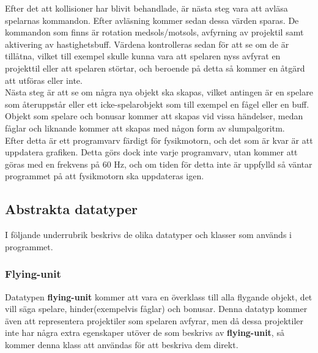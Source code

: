 \documentclass[12pt,a4paper]{article}
\begin{document}
Efter det att kollisioner har blivit behandlade, är nästa steg vara att avläsa spelarnas kommandon. Efter avläsning kommer sedan dessa värden sparas. De kommandon som finns är rotation medsols/motsols, avfyrning av projektil samt aktivering av hastighetsbuff. Värdena kontrolleras sedan för att se om de är tillåtna, vilket till exempel skulle kunna vara att spelaren nyss avfyrat en projekttil eller att spelaren störtar, och beroende på detta så kommer en åtgärd att utföras eller inte. \\

Nästa steg är att se om några nya objekt ska skapas, vilket antingen är en spelare som återuppstår eller ett icke-spelarobjekt som till exempel en fågel eller en buff. Objekt som spelare och bonusar kommer att skapas vid vissa händelser, medan fåglar och liknande kommer att skapas med någon form av slumpalgoritm. \\

Efter detta är ett programvarv färdigt för fysikmotorn, och det som är kvar är att uppdatera grafiken. Detta görs dock inte varje programvarv, utan kommer att göras med en frekvens på 60 Hz, och om tiden för detta inte är uppfylld så väntar programmet på att fysikmotorn ska uppdateras igen.

\subsection{Abstrakta datatyper}
I följande underrubrik beskrivs de olika datatyper och klasser som används i programmet.

\subsubsection{Flying-unit}
Datatypen \textbf{flying-unit} kommer att vara en överklass till alla flygande objekt, det vill säga spelare, hinder(exempelvis fåglar) och bonusar. Denna datatyp kommer även att representera projektiler som spelaren avfyrar, men då dessa projektiler inte har några extra egenskaper utöver de som beskrivs av \textbf{flying-unit}, så kommer denna klass att användas för att beskriva dem direkt.
\vspace{0.2cm}
\end{document}
